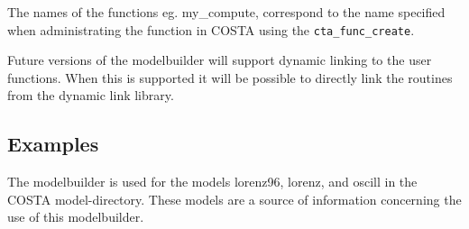 The names of the functions eg. my\_compute, correspond to the name specified when administrating the function in
COSTA using the {\tt cta\_func\_create}. 

Future versions of the modelbuilder will support dynamic linking to the user functions. When this is supported it
will be possible to directly link the routines from the dynamic link library. 

\subsection{Examples}
The modelbuilder is used for the models lorenz96, lorenz, and oscill in the COSTA model-directory. These models are
a source of information concerning the use of this modelbuilder.


